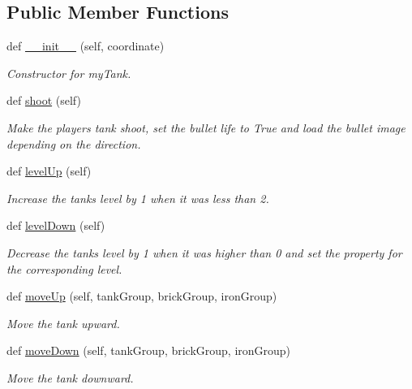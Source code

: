 \subsection*{Public Member Functions}
\begin{DoxyCompactItemize}
\item 
def \mbox{\hyperlink{classmy_tank_1_1_my_tank_a5a2b6c586c454d3801f6701a6befb7e5}{\+\_\+\+\_\+init\+\_\+\+\_\+}} (self, coordinate)
\begin{DoxyCompactList}\small\item\em Constructor for my\+Tank. \end{DoxyCompactList}\item 
def \mbox{\hyperlink{classmy_tank_1_1_my_tank_acdfd332c81569ae077b51500ab9471e0}{shoot}} (self)
\begin{DoxyCompactList}\small\item\em Make the players\textquotesingle{} tank shoot, set the bullet life to True and load the bullet image depending on the direction. \end{DoxyCompactList}\item 
def \mbox{\hyperlink{classmy_tank_1_1_my_tank_ad3e73075a206bf2ca14412bea6db8d36}{level\+Up}} (self)
\begin{DoxyCompactList}\small\item\em Increase the tank\textquotesingle{}s level by 1 when it was less than 2. \end{DoxyCompactList}\item 
def \mbox{\hyperlink{classmy_tank_1_1_my_tank_aebffcf72197496d9209989066f0ff5c1}{level\+Down}} (self)
\begin{DoxyCompactList}\small\item\em Decrease the tank\textquotesingle{}s level by 1 when it was higher than 0 and set the property for the corresponding level. \end{DoxyCompactList}\item 
def \mbox{\hyperlink{classmy_tank_1_1_my_tank_aecbf1ca9583a93e009e7b9500e217a44}{move\+Up}} (self, tank\+Group, brick\+Group, iron\+Group)
\begin{DoxyCompactList}\small\item\em Move the tank upward. \end{DoxyCompactList}\item 
def \mbox{\hyperlink{classmy_tank_1_1_my_tank_a1f7299a4f87790fbfb0d3323196547ae}{move\+Down}} (self, tank\+Group, brick\+Group, iron\+Group)
\begin{DoxyCompactList}\small\item\em Move the tank downward. \end{DoxyCompactList}\item 

\end{DoxyCompactItemize}
